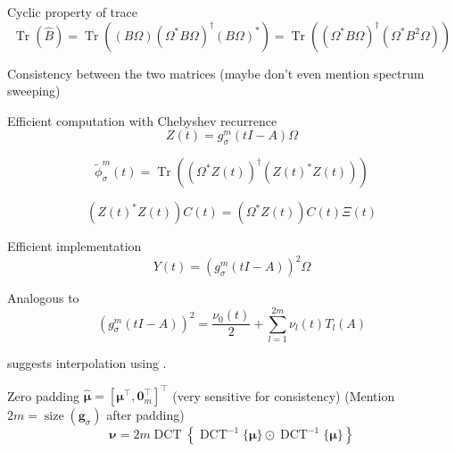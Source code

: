Cyclic property of trace
\begin{equation}
    \operatorname{Tr}(\widehat{B})
        = \operatorname{Tr}\left((B \Omega) (\Omega^{\ast} B \Omega)^{\dagger} (B \Omega)^{\ast} \right)
        = \operatorname{Tr}\left((\Omega^{\ast} B \Omega)^{\dagger} (\Omega^{\ast} B^2 \Omega) \right)
    \label{equ:3-nystrom-SS-nystrom-trace}
\end{equation}

Consistency between the two matrices (maybe don't even mention spectrum sweeping)

Efficient computation with Chebyshev recurrence
\begin{equation}
    Z(t) = g_{\sigma}^m(tI - A) \Omega
    \label{equ:3-nystrom-SS-Z}
\end{equation}

\begin{equation}
    \widetilde{\phi}_{\sigma}^m(t)
        = \operatorname{Tr}\left((\Omega^{\ast} Z(t))^{\dagger} (Z(t)^{\ast} Z(t))\right)
    \label{equ:3-nystrom-SS-spectral-density}
\end{equation}

\begin{equation}
    (Z(t)^{\ast} Z(t)) C(t) = (\Omega^{\ast} Z(t)) C(t) \Xi(t)
    \label{equ:3-nystrom-SS-generalized-eigenproblem}
\end{equation}

Efficient implementation
\begin{equation}
    Y(t) = (g_{\sigma}^m(tI - A))^2 \Omega
    \label{equ:3-nystrom-SS-Y}
\end{equation}

Analogous to 
\begin{equation}
    (g_{\sigma}^m(tI - A))^2 = \frac{\nu_0(t)}{2} + \sum_{l=1}^{2m} \nu_l(t) T_l(A)
    \label{equ:3-nystrom-ESS-chebyshev-expansion}
\end{equation}

\cite{lin2017randomized} suggests interpolation using .

\cite[Proposition~3.1]{baszenski1997cosine}
Zero padding $\widehat{\boldsymbol{\mu}} = [\boldsymbol{\mu}^{\top}, \boldsymbol{0}_{m}^{\top}]^{\top}$ (very sensitive for consistency)
(Mention $2m = \operatorname{size}(\boldsymbol{g}_{\sigma})$ after padding)
\begin{equation}
    \boldsymbol{\nu} = 2 m \operatorname{DCT}\left\{ \operatorname{DCT}^{-1}\{\boldsymbol{\mu}\} \odot \operatorname{DCT}^{-1}\{\boldsymbol{\mu}\} \right\}
    \label{equ:3-nystrom-ESS-square-coefficients}
\end{equation}

